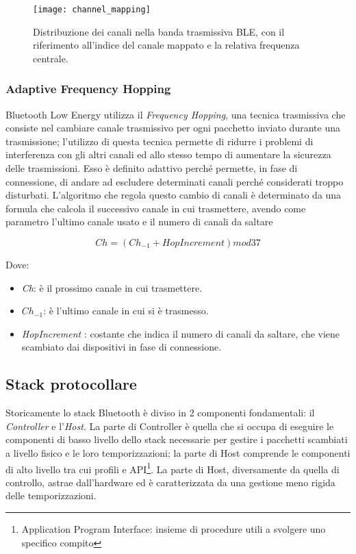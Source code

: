 \begin{figure}[H]
\caption{Distribuzione dei canali nella banda trasmissiva BLE, con il riferimento all'indice del canale mappato e la relativa frequenza centrale.}
\texttt{[image: channel\_mapping]}
\centering
\label{channel_mapping}
\end{figure}




\subsubsection{Adaptive Frequency Hopping}\label{freqHopping}
Bluetooth Low Energy utilizza il \emph{Frequency Hopping}, una tecnica trasmissiva che consiste nel cambiare canale trasmissivo per ogni pacchetto inviato durante una trasmissione; l'utilizzo di questa tecnica permette di ridurre i problemi di interferenza con gli altri canali ed allo stesso tempo di aumentare la sicurezza delle trasmissioni. Esso è definito adattivo perché permette, in fase di connessione, di andare ad escludere determinati canali perché considerati troppo disturbati. L'algoritmo che regola questo cambio di canali è determinato da una formula che calcola il successivo canale in cui trasmettere, avendo come parametro l'ultimo canale usato e il numero di canali da saltare

\[Ch = (Ch_{-1} + HopIncrement)mod 37\]

Dove:
\begin{itemize}
\item[] \emph{Ch}: è il prossimo canale in cui trasmettere.
\item[] $Ch_{-1}$: è l'ultimo canale in cui si è trasmesso.
\item[] \emph{HopIncrement} : costante che indica il numero di canali da saltare, che viene scambiato dai dispositivi in fase di connessione.
\end{itemize}

\subsection{Stack protocollare}
Storicamente lo stack Bluetooth è diviso in 2 componenti fondamentali: il \emph{Controller} e l'\emph{Host}.
La parte di Controller è quella che si occupa di eseguire le componenti di basso livello dello stack necessarie per gestire i pacchetti scambiati a livello fisico e le loro temporizzazioni; la parte di Host comprende le componenti di alto livello tra cui profili e API\footnote{Application Program Interface: insieme di procedure utili a svolgere uno specifico compito}. La parte di Host, diversamente da quella di controllo, astrae dall'hardware ed è caratterizzata da una gestione meno rigida delle temporizzazioni.

